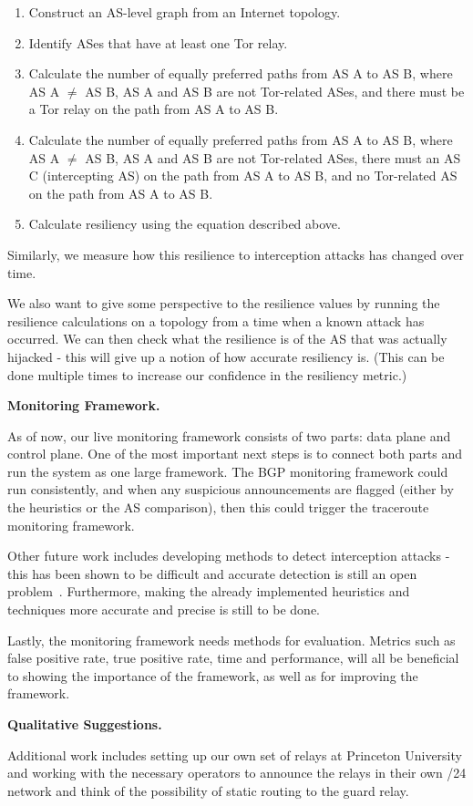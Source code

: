 \begin{enumerate}
\item Construct an AS-level graph from an Internet topology.
\item Identify ASes that have at least one Tor relay.
\item Calculate the number of equally preferred paths from AS A to AS B, where AS A $\neq$ AS B, AS A and AS B are not Tor-related ASes, and there must be a Tor relay on the path from AS A to AS B.
\item Calculate the number of equally preferred paths from AS A to AS B, where AS A $\neq$ AS B, AS A and AS B are not Tor-related ASes, there must an AS C (intercepting AS) on the path from AS A to AS B, and no Tor-related AS on the path from AS A to AS B.
\item Calculate resiliency using the equation described above.
\end{enumerate}

Similarly, we measure how this resilience to interception attacks has changed over time. 

We also want to give some perspective to the resilience values by running the resilience calculations on a topology from a time when a known attack has occurred.  We can then check what the resilience is of the AS that was actually hijacked - this will give up a notion of how accurate resiliency is.  (This can be done multiple times to increase our confidence in the resiliency metric.)

{\bf Monitoring Framework.}  

As of now, our live monitoring framework consists of two parts: data plane and control plane.  One of the most important next steps is to connect both parts and run the system as one large framework.  The BGP monitoring framework could run consistently, and when any suspicious announcements are flagged (either by the heuristics or the AS comparison), then this could trigger the traceroute monitoring framework.  

Other future work includes developing methods to detect interception attacks - this has been shown to be difficult and accurate detection is still an open problem~\cite{ballani2007study}.  Furthermore, making the already implemented heuristics and techniques more accurate and precise is still to be done.  

Lastly, the monitoring framework needs methods for evaluation.  Metrics such as false positive rate, true positive rate, time and performance, will all be beneficial to showing the importance of the framework, as well as for improving the framework.  

{\bf Qualitative Suggestions.}

Additional work includes setting up our own set of relays at Princeton University and working with the necessary operators to announce the relays in their own /24 network and think of the possibility of static routing to the guard relay.
